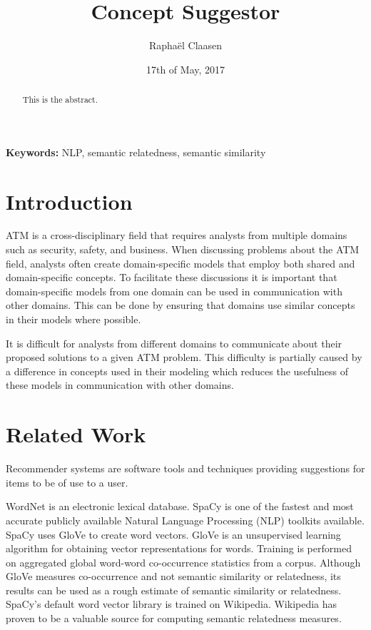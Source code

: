 \documentclass{article}
\title{Concept Suggestor}
\date{17th of May, 2017}
\author{Rapha\"el Claasen}
\begin{document}
\maketitle

\begin{abstract}
This is the abstract.
\end{abstract}

{\bf Keywords:} NLP, semantic relatedness, semantic similarity

\section{Introduction}

ATM is a cross-disciplinary field that requires analysts from multiple domains such as security, safety, and business. When discussing problems about the ATM field, analysts often create domain-specific models that employ both shared and domain-specific concepts. To facilitate these discussions it is important that domain-specific models from one domain can be used in communication with other domains. This can be done by ensuring that domains use similar concepts in their models where possible.

It is difficult for analysts from different domains to communicate about their proposed solutions to a given ATM problem. This difficulty is partially caused by a difference in concepts used in their modeling which reduces the usefulness of these models in communication with other domains.

\section{Related Work}

Recommender systems are software tools and techniques providing suggestions for items to be of use to a user.\cite{ricci2011introduction}

WordNet is an electronic lexical database.\cite{kilgarriff2000wordnet}
SpaCy is one of the fastest and most accurate publicly available Natural Language Processing (NLP) toolkits available.\cite{choi2015depends}
SpaCy uses GloVe to create word vectors. GloVe is an unsupervised learning algorithm for obtaining vector representations for words. Training is performed on aggregated global word-word co-occurrence statistics from a corpus.\cite{pennington2014glove} Although GloVe measures co-occurrence and not semantic similarity or relatedness, its results can be used as a rough estimate of semantic similarity or relatedness.\cite{levy2015improving} SpaCy's default word vector library is trained on Wikipedia. Wikipedia has proven to be a valuable source for computing semantic relatedness measures.\cite{strube2006wikirelate}
\end{document}
